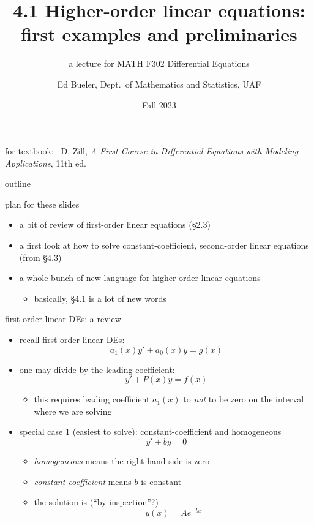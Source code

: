 \documentclass{beamer}
\title{4.1 Higher-order linear equations: \\ first examples and preliminaries \\ \phantom{x}}
\subtitle{a lecture for MATH F302 Differential Equations}
\author{Ed Bueler, Dept.~of Mathematics and Statistics, UAF}
\date{Fall 2023}
\begin{document}


\begin{frame}
\titlepage

\centerline{\tiny for textbook: \, D. Zill, \emph{A First Course in Differential Equations with Modeling Applications}, 11th ed.}
\end{frame}


\begin{frame}{outline}

plan for these slides
\begin{itemize}
\item a bit of review of first-order linear equations (\S2.3)
\item a first look at how to solve constant-coefficient, second-order linear equations (from \S4.3)
\item a whole bunch of new language for higher-order linear equations
    \begin{itemize}
    \item basically, \S4.1 is a lot of new words
    \end{itemize}
\end{itemize}
\end{frame}


\begin{frame}{first-order linear DEs: a review}

\begin{itemize}
\item recall first-order linear DEs:
    $$a_1(x) y' + a_0(x) y = g(x)$$
\item one may divide by the leading coefficient:
    $$y' + P(x) y = f(x)$$

    \begin{itemize}
    \item \alert{this requires leading coefficient $a_1(x)$ to \emph{not} to be zero} on the interval where we are solving
    \end{itemize}
\item special case 1 (\alert{easiest to solve}): constant-coefficient and homogeneous
    $$y' + b y = 0$$

    \begin{itemize}
    \item \emph{homogeneous} means the right-hand side is zero
    \item \emph{constant-coefficient} means $b$ is constant
    \item the solution is (``by inspection''?)
        $$y(x) = A e^{-bx}$$
    \end{itemize}
\end{itemize}
\end{frame}
\end{document}
